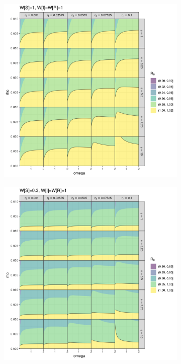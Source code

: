 \documentclass{article}\usepackage[]{graphicx}\usepackage[]{color}
\begin{document}
\begin{figure}
\centering
\begin{subfigure}[t]{.45\textwidth}
\centering
\includegraphics[width=\linewidth]{../pix/R0contour_random_s.png}
        \caption{}\label{fig:fig_a}
\end{subfigure}
%
\begin{subfigure}[t]{.45\textwidth}
\centering
\includegraphics[width=\linewidth]{../pix/R0contour_TTI_s.png}
\caption{}\label{fig:fig_b}
\end{subfigure}
\end{figure}
\end{document}
